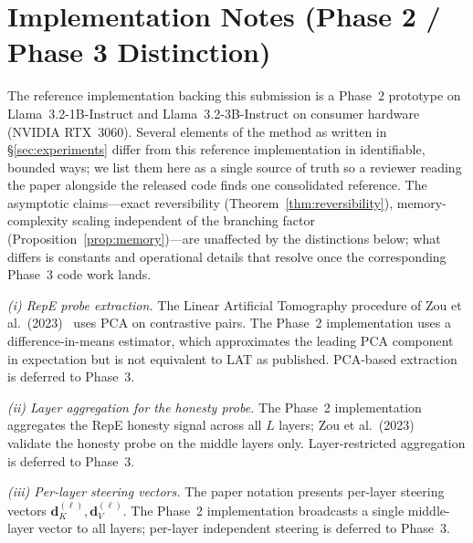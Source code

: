 \documentclass{article}
\begin{document}
\section{Implementation Notes (Phase 2 / Phase 3 Distinction)}\label{sec:appendix-impl-notes}

The reference implementation backing this submission is a Phase~2 prototype on Llama~3.2-1B-Instruct and Llama~3.2-3B-Instruct on consumer hardware (NVIDIA RTX~3060). Several elements of the method as written in §\ref{sec:experiments} differ from this reference implementation in identifiable, bounded ways; we list them here as a single source of truth so a reviewer reading the paper alongside the released code finds one consolidated reference. The asymptotic claims---exact reversibility (Theorem~\ref{thm:reversibility}), memory-complexity scaling independent of the branching factor (Proposition~\ref{prop:memory})---are unaffected by the distinctions below; what differs is constants and operational details that resolve once the corresponding Phase~3 code work lands.

\textit{(i) RepE probe extraction.} The Linear Artificial Tomography procedure of Zou et al.\ (2023)~\cite{zou2023repe} uses PCA on contrastive pairs. The Phase~2 implementation uses a difference-in-means estimator, which approximates the leading PCA component in expectation but is not equivalent to LAT as published. PCA-based extraction is deferred to Phase~3.

\textit{(ii) Layer aggregation for the honesty probe.} The Phase~2 implementation aggregates the RepE honesty signal across all $L$ layers; Zou et al.\ (2023)~\cite{zou2023repe} validate the honesty probe on the middle layers only. Layer-restricted aggregation is deferred to Phase~3.

\textit{(iii) Per-layer steering vectors.} The paper notation presents per-layer steering vectors $\mathbf{d}_K^{(\ell)}, \mathbf{d}_V^{(\ell)}$. The Phase~2 implementation broadcasts a single middle-layer vector to all layers; per-layer independent steering is deferred to Phase~3.
\end{document}
